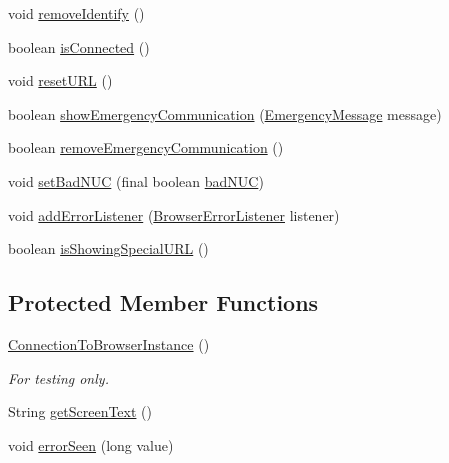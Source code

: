 \begin{DoxyCompactItemize}
\item 
void \hyperlink{classgov_1_1fnal_1_1ppd_1_1dd_1_1display_1_1client_1_1ConnectionToBrowserInstance_a1d644697246321d2210bd5e82426e956}{remove\-Identify} ()
\item 
boolean \hyperlink{classgov_1_1fnal_1_1ppd_1_1dd_1_1display_1_1client_1_1ConnectionToBrowserInstance_ad564b4814a0652f8ae7a14f70147e493}{is\-Connected} ()
\item 
void \hyperlink{classgov_1_1fnal_1_1ppd_1_1dd_1_1display_1_1client_1_1ConnectionToBrowserInstance_a43c95f4a9d8241a513fc1d4074748b06}{reset\-U\-R\-L} ()
\item 
boolean \hyperlink{classgov_1_1fnal_1_1ppd_1_1dd_1_1display_1_1client_1_1ConnectionToBrowserInstance_ad0e8239b4a95ac152c5746fb8249dfca}{show\-Emergency\-Communication} (\hyperlink{classgov_1_1fnal_1_1ppd_1_1dd_1_1emergency_1_1EmergencyMessage}{Emergency\-Message} message)
\item 
boolean \hyperlink{classgov_1_1fnal_1_1ppd_1_1dd_1_1display_1_1client_1_1ConnectionToBrowserInstance_a05ca59c4a52ee2d972cbd57dfd62c880}{remove\-Emergency\-Communication} ()
\item 
void \hyperlink{classgov_1_1fnal_1_1ppd_1_1dd_1_1display_1_1client_1_1ConnectionToBrowserInstance_a8d781733f348ac915b8ba330e2c5ec6b}{set\-Bad\-N\-U\-C} (final boolean \hyperlink{classgov_1_1fnal_1_1ppd_1_1dd_1_1display_1_1client_1_1ConnectionToBrowserInstance_aefdf61dc2db3974e98e8b1bc1fcd1807}{bad\-N\-U\-C})
\item 
void \hyperlink{classgov_1_1fnal_1_1ppd_1_1dd_1_1display_1_1client_1_1ConnectionToBrowserInstance_aa2c91771874c22df3f0f316f344f9d0f}{add\-Error\-Listener} (\hyperlink{interfacegov_1_1fnal_1_1ppd_1_1dd_1_1display_1_1client_1_1BrowserErrorListener}{Browser\-Error\-Listener} listener)
\item 
boolean \hyperlink{classgov_1_1fnal_1_1ppd_1_1dd_1_1display_1_1client_1_1ConnectionToBrowserInstance_a6e969328f1fcd309a1a46bbe737eb6cf}{is\-Showing\-Special\-U\-R\-L} ()
\end{DoxyCompactItemize}
\subsection*{Protected Member Functions}
\begin{DoxyCompactItemize}
\item 
\hyperlink{classgov_1_1fnal_1_1ppd_1_1dd_1_1display_1_1client_1_1ConnectionToBrowserInstance_a62e9f3f45ac4ac5f73f5354222f91d9b}{Connection\-To\-Browser\-Instance} ()
\begin{DoxyCompactList}\small\item\em For testing only. \end{DoxyCompactList}\item 
String \hyperlink{classgov_1_1fnal_1_1ppd_1_1dd_1_1display_1_1client_1_1ConnectionToBrowserInstance_a632316a17bf8ccd3f20796d31e1b1d9d}{get\-Screen\-Text} ()
\item 
void \hyperlink{classgov_1_1fnal_1_1ppd_1_1dd_1_1display_1_1client_1_1ConnectionToBrowserInstance_a109be55359b99967b7fbfe59d8614eca}{error\-Seen} (long value)
\end{DoxyCompactItemize}
